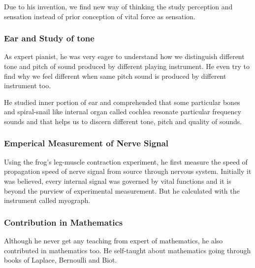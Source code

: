\documentclass[11pt]{article}
\begin{document}
Due to his invention, we find new way of thinking the study perception and sensation instead of prior conception of vital force as sensation.

\subsubsection{Ear and Study of tone}
As expert pianist, he was very eager to understand how we distinguish different tone and pitch of sound produced by different playing instrument. He even try to find why we feel different when same pitch sound is produced by different instrument too.

He studied inner portion of ear and comprehended that some particular bones and spiral-snail like internal organ called cochlea resonate particular frequency sounds and that helps us to discern different tone, pitch and quality of sounds.



\subsubsection{Emperical Measurement of Nerve Signal}
Using the frog's leg-muscle contraction experiment, he first measure the speed of propagation speed of nerve signal from source through nervous system.
Initially it was believed, every internal signal was governed by vital functions and it is beyond the purview of experimental measurement. But he calculated with the instrument called myograph.



\subsubsection{Contribution in Mathematics}
Although he never get any teaching from expert of mathematics, he also contributed in mathematics too. He self-taught about mathematics going through books of Laplace, Bernoulli and Biot.
\end{document}
